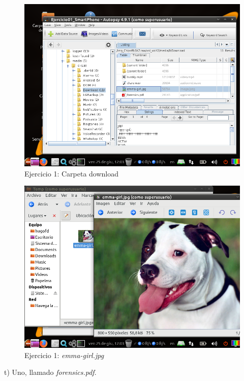 \documentclass[11pt]{article}
\begin{document}
\begin{figure}[H]
    \caption{Ejercicio 1: Carpeta download}
    \centering
    \includegraphics[scale=0.7]{e1-20.png}
\end{figure}

\begin{figure}[H]
    \caption{Ejercicio 1: \textit{emma-girl.jpg}}
    \centering
    \includegraphics[scale=0.7]{e1-19.png}
\end{figure}

t) Uno, llamado \textit{forensics.pdf}.
\end{document}
